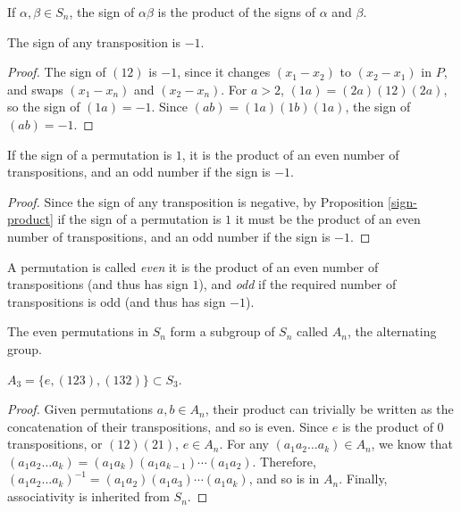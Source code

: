 \documentclass[12pt]{article}
\begin{document}
\begin{prop}\label{sign-product}
    If $\alpha, \beta \in S_n$, the sign of $\alpha\beta$ is the product of the signs of $\alpha$ and $\beta$.
\end{prop}

\begin{prop}
    The sign of any transposition is $-1$.
\end{prop}

\begin{proof}\label{transposition-sign-is-negative}
    The sign of $(12)$ is $-1$, since it changes $(x_1 - x_2)$ to $(x_2 - x_1)$ in $P$, and swaps $(x_1 - x_n)$ and $(x_2 - x_n)$. For $a > 2$, $(1a) = (2a)(12)(2a)$, so the sign of $(1a) = -1$. Since $(ab) = (1a)(1b)(1a)$, the sign of $(ab) = -1$.
\end{proof}

\begin{prop}
    If the sign of a permutation is $1$, it is the product of an even number of transpositions, and an odd number if the sign is $-1$.
\end{prop}

\begin{proof}
    Since the sign of any transposition is negative, by Proposition \ref{sign-product} if the sign of a permutation is $1$ it must be the product of an even number of transpositions, and an odd number if the sign is $-1$.
\end{proof}

\begin{defn}
    A permutation is called \emph{even} it is the product of an even number of transpositions (and thus has sign $1$), and \emph{odd} if the required number of transpositions is odd (and thus has sign $-1$).
\end{defn}

\begin{thm}
    The even permutations in $S_n$ form a subgroup of $S_n$ called $A_n$, the alternating group.
\end{thm}

\begin{exmp}
    $A_3 = \{e, (123), (132)\} \subset S_3$.
\end{exmp}

\begin{proof}
    Given permutations $a, b \in A_n$, their product can trivially be written as the concatenation of their transpositions, and so is even. Since $e$ is the product of $0$ transpositions, or $(12)(21)$, $e \in A_n$. For any $(a_1a_2\ldots a_k) \in A_n$, we know that $(a_1a_2\ldots a_k) = (a_1a_k)(a_1a_{k-1})\cdots(a_1a_2)$. Therefore, $(a_1a_2\ldots a_k)^{-1} = (a_1a_2)(a_1a_3)\cdots(a_1a_k)$, and so is in $A_n$. Finally, associativity is inherited from $S_n$.
\end{proof}
\end{document}
